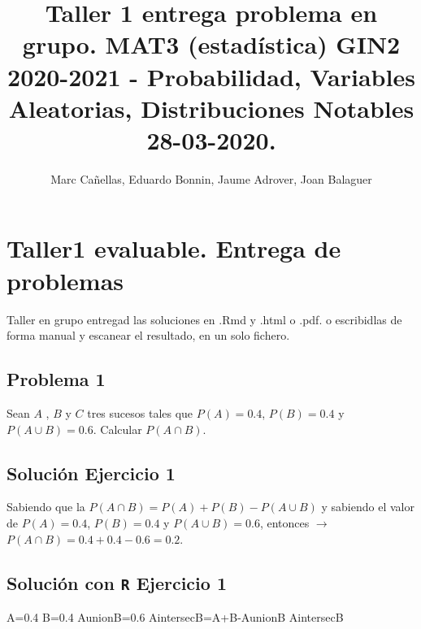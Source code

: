 \documentclass[
]{article}
\title{Taller 1 entrega problema en grupo. MAT3 (estadística) GIN2
2020-2021 - Probabilidad, Variables Aleatorias, Distribuciones Notables
28-03-2020.}
\author{Marc Cañellas, Eduardo Bonnin, Jaume Adrover, Joan Balaguer}
\date{}
\newenvironment{Shaded}{\begin{snugshade}}{\end{snugshade}}
\newcommand{\FloatTok}[1]{\textcolor[rgb]{0.00,0.00,0.81}{#1}}
\newcommand{\NormalTok}[1]{#1}
\newcommand{\OtherTok}[1]{\textcolor[rgb]{0.56,0.35,0.01}{#1}}
\newcommand{\SpecialCharTok}[1]{\textcolor[rgb]{0.00,0.00,0.00}{#1}}
\begin{document}
\maketitle

\hypertarget{taller1-evaluable.-entrega-de-problemas}{%
\section{Taller1 evaluable. Entrega de
problemas}\label{taller1-evaluable.-entrega-de-problemas}}

Taller en grupo entregad las soluciones en .Rmd y .html o .pdf. o
escribidlas de forma manual y escanear el resultado, en un solo fichero.

\hypertarget{problema-1}{%
\subsection{Problema 1}\label{problema-1}}

Sean \(A\) , \(B\) y \(C\) tres sucesos tales que \(P(A)=0.4\),
\(P(B)=0.4\) y \(P(A\cup B)=0.6\). Calcular \(P(A\cap B)\).

\hypertarget{soluciuxf3n-ejercicio-1}{%
\subsection{Solución Ejercicio 1}\label{soluciuxf3n-ejercicio-1}}

Sabiendo que la \(P(A\cap B)= P(A)+P(B)-P(A\cup B)\) y sabiendo el valor
de \(P(A)=0.4\), \(P(B)=0.4\) y \(P(A\cup B)=0.6\), entonces
\(\longrightarrow\) \(P(A\cap B)= 0.4+0.4-0.6 = 0.2\).

\hypertarget{soluciuxf3n-con-r-ejercicio-1}{%
\subsection{\texorpdfstring{Solución con \texttt{R} Ejercicio
1}{Solución con R Ejercicio 1}}\label{soluciuxf3n-con-r-ejercicio-1}}

\begin{Shaded}
\begin{Highlighting}[]
\NormalTok{A}\OtherTok{=}\FloatTok{0.4}
\NormalTok{B}\OtherTok{=}\FloatTok{0.4}
\NormalTok{AunionB}\OtherTok{=}\FloatTok{0.6}
\NormalTok{AintersecB}\OtherTok{=}\NormalTok{A}\SpecialCharTok{+}\NormalTok{B}\SpecialCharTok{{-}}\NormalTok{AunionB}
\NormalTok{AintersecB}
\end{Highlighting}
\end{Shaded}
\end{document}

